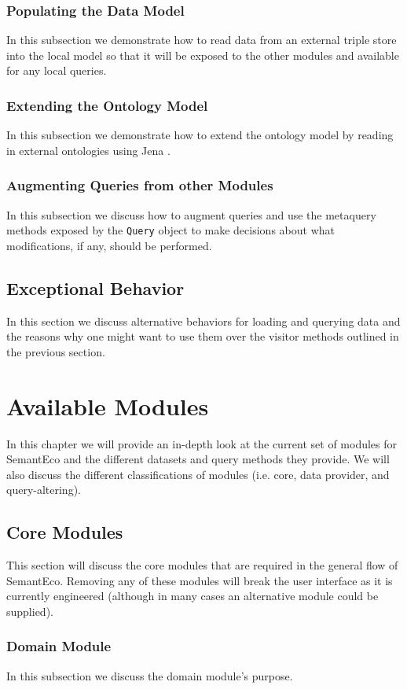 \documentclass[letterpaper]{report}
\begin{document}
\subsection{Populating the Data Model}
In this subsection we demonstrate how to read data from an external triple store into the local model so that it will be exposed to the other modules and available for any local queries.
\subsection{Extending the Ontology Model}
In this subsection we demonstrate how to extend the ontology model by reading in external ontologies using Jena \cite{Jena}.
\subsection{Augmenting Queries from other Modules}
In this subsection we discuss how to augment queries and use the metaquery methods exposed by the \texttt{Query} object to make decisions about what modifications, if any, should be performed.
\section{Exceptional Behavior}
In this section we discuss alternative behaviors for loading and querying data and the reasons why one might want to use them over the visitor methods outlined in the previous section.
\chapter{Available Modules}
In this chapter we will provide an in-depth look at the current set of modules for SemantEco and the different datasets and query methods they provide. We will also discuss the different classifications of modules (i.e. core, data provider, and query-altering).
\section{Core Modules}
This section will discuss the core modules that are required in the general flow of SemantEco. Removing any of these modules will break the user interface as it is currently engineered (although in many cases an alternative module could be supplied).
\subsection{Domain Module}
In this subsection we discuss the domain module's purpose.
\end{document}
